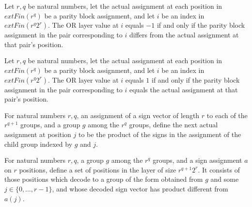 \begin{theorem}
\label{FABL.parityLayerValues_or_eq_neg_one_iff}
\leanok
{}
Let $r,q$ be natural numbers, let the actual assignment at each position in
$	ext{Fin}(r^q)$ be a parity block assignment, and let $i$ be an index in
$	ext{Fin}(r^q2^r)$. The OR layer value at $i$ equals $-1$ if and only if the parity
block assignment in the pair corresponding to $i$ differs from the actual assignment at
that pair's position.
\end{theorem}

\begin{theorem}
\label{FABL.parityLayerValues_or_eq_one_iff}
\leanok
{}
Let $r,q$ be natural numbers, let the actual assignment at each position in
$	ext{Fin}(r^q)$ be a parity block assignment, and let $i$ be an index in
$	ext{Fin}(r^q2^r)$. The OR layer value at $i$ equals $1$ if and only if the parity
block assignment in the pair corresponding to $i$ equals the actual assignment at that
pair's position.
\end{theorem}

\begin{definition}
\label{FABL.parityNextActualAssignment}
\leanok
{}
For natural numbers $r,q$, an assignment of a sign vector of length $r$ to each of the
$r^{q+1}$ groups, and a group $g$ among the $r^q$ groups, define the next actual
assignment at position $j$ to be the product of the signs in the assignment of the child
group indexed by $g$ and $j$.
\end{definition}

\begin{definition}
\label{FABL.parityNextNodeInputs}
\leanok
{}
For natural numbers $r,q$, a group $g$ among the $r^q$ groups, and a sign assignment $a$
on $r$ positions, define a set of positions in the layer of size $r^{q+1}2^r$. It
consists of those positions which decode to a group of the form obtained from $g$ and
some $j\in\{0,\ldots,r-1\}$, and whose decoded sign vector has product different from
$a(j)$.
\end{definition}

